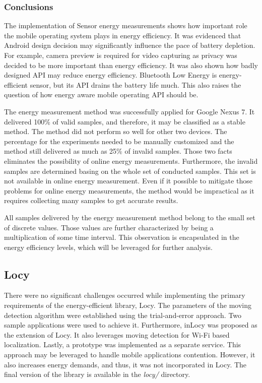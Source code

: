    
\subsubsection{Conclusions}   
\hspace{10pt} The implementation of Sensor energy measurements shows how important role the mobile operating system plays in energy efficiency. It was evidenced that Android design decision may significantly influence the pace of battery depletion. For example, camera preview is required for video capturing as privacy was decided to be more important than energy efficiency. It was also shown how badly designed API may reduce energy efficiency. Bluetooth Low Energy is energy-efficient sensor, but its API drains the battery life much. This also raises the question of how energy aware mobile operating API should be.

The energy measurement method was successfully applied for Google Nexus 7. It delivered 100\% of valid samples, and therefore, it may be classified as a stable method. The method did not perform so well for other two devices. The percentage for the experiments needed to be manually customized and the method still delivered as much as 25\% of invalid samples. Those two facts eliminates the possibility of online energy measurements. Furthermore, the invalid samples are determined basing on the whole set of conducted samples. This set is not available in online energy measurement. Even if it possible to mitigate those problems for online energy measurements, the method would be impractical as it requires collecting many samples to get accurate results.  

All samples delivered by the energy measurement method belong to the small set of discrete values. Those values are further characterized by being a multiplication of some time interval. This observation is encapsulated in the energy efficiency levels, which will be leveraged for further analysis. 

\subsection{Locy}
There were no significant challenges occurred while implementing the primary requirements of the energy-efficient library, Locy. The parameters of the moving detection algorithm were established using the trial-and-error approach. Two sample applications were used to achieve it. Furthermore, inLocy was proposed as the extension of Locy. It also leverages moving detection for Wi-Fi based localization. Lastly, a prototype was implemented as a separate service. This approach may be leveraged to handle mobile applications contention. However, it also increases energy demands, and thus, it was not incorporated in Locy. The final version of the library is available in the \textit{locy/} directory. 

